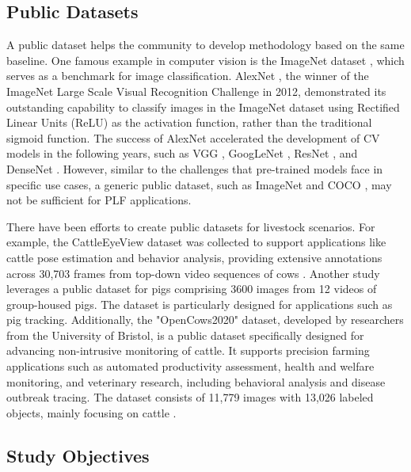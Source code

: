 \subsection*{Public Datasets}

A public dataset helps the community to develop methodology based on the same baseline. One famous example in computer vision is the ImageNet dataset \cite{deng2009imagenet}, which serves as a benchmark for image classification. AlexNet \cite{krizhevsky2017imagenet}, the winner of the ImageNet Large Scale Visual Recognition Challenge in 2012, demonstrated its outstanding capability to classify images in the ImageNet dataset using Rectified Linear Units (ReLU) as the activation function, rather than the traditional sigmoid function. The success of AlexNet accelerated the development of CV models in the following years, such as VGG \cite{karen2014very}, GoogLeNet \cite{szegedy2015going}, ResNet \cite{targ2016resnet}, and DenseNet \cite{huang2017densely}. However, similar to the challenges that pre-trained models face in specific use cases, a generic public dataset, such as ImageNet \cite{deng2009imagenet} and COCO \cite{lin2014microsoft}, may not be sufficient for PLF applications. 

There have been efforts to create public datasets for livestock scenarios. For example, the CattleEyeView dataset was collected to support applications like cattle pose estimation and behavior analysis, providing extensive annotations across 30,703 frames from top-down video sequences of cows \cite{ong2023cattleeyeview}. Another study \cite{t2020long} leverages a public dataset for pigs comprising 3600 images from 12 videos of group-housed pigs. The dataset is particularly designed for applications such as pig tracking. Additionally, the "OpenCows2020" dataset, developed by researchers from the University of Bristol, is a public dataset specifically designed for advancing non-intrusive monitoring of cattle. It supports precision farming applications such as automated productivity assessment, health and welfare monitoring, and veterinary research, including behavioral analysis and disease outbreak tracing. The dataset consists of 11,779 images with 13,026 labeled objects, mainly focusing on cattle \cite{visualization-tools-for-opencows2020-dataset}. 

\subsection*{Study Objectives}

